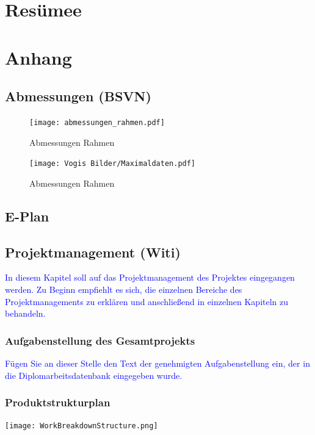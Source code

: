
\section{Resümee}


\section{Anhang}

\subsection{Abmessungen (BSVN)}


\begin{figure}[H]
    \texttt{[image: abmessungen\_rahmen.pdf]}
    \centering
    \caption{Abmessungen Rahmen}
\end{figure}
\begin{figure}[H]
    \texttt{[image: Vogis Bilder/Maximaldaten.pdf]}
    \centering
    \caption{Abmessungen Rahmen}
\end{figure}

\subsection{E-Plan}

\subsection{Projektmanagement (Witi)}
\textcolor{blue}{In diesem Kapitel soll auf das Projektmanagement des Projektes eingegangen werden. Zu Beginn empfiehlt es sich, die einzelnen Bereiche des Projektmanagements zu erklären und anschließend in einzelnen Kapiteln zu behandeln.}

\subsubsection{Aufgabenstellung des Gesamtprojekts}
\textcolor{blue}{Fügen Sie an dieser Stelle den Text der genehmigten Aufgabenstellung ein, der in die Diplomarbeitsdatenbank  eingegeben wurde.}

\subsubsection{Produktstrukturplan}
\vspace{5mm}

\bgroup
    \centering
    \texttt{[image: WorkBreakdownStructure.png]}
\egroup

